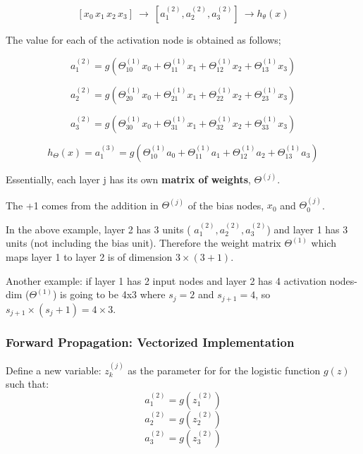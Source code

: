             \[
                \boxed{
                [x_0 \, x_1 \, x_2\, x_3] \:\rightarrow \: [ a_1^{(2)},a_2^{(2)},a_3^{(2)}] \: \rightarrow h_\theta (x)
            }
            \]  
    
            The value for each of the activation node is obtained as follows;

            \[
                a_1^{(2)} = g (\Theta^{(1)}_{10} x_0 + \Theta^{(1)}_{11} x_1 + \Theta^{(1)}_{12} x_2+\Theta^{(1)}_{13} x_3 )
            \] 

            \[
                a_2^{(2)} = g (\Theta^{(1)}_{20} x_0 + \Theta^{(1)}_{21} x_1 + \Theta^{(1)}_{22} x_2+\Theta^{(1)}_{23} x_3 )
            \] 

            \[
                a_3^{(2)} = g (\Theta^{(1)}_{30} x_0 + \Theta^{(1)}_{31} x_1 + \Theta^{(1)}_{32} x_2+\Theta^{(1)}_{33} x_3 )
            \] 

            \[
                h_\Theta(x) = a_1^{(3)} = g (\Theta^{(1)}_{10} a_0 + \Theta^{(1)}_{11} a_1 + \Theta^{(1)}_{12} a_2+\Theta^{(1)}_{13} a_3 )
            \] 

            Essentially, each layer j has its own \textbf{matrix of weights}, $\Theta^{(j)}$.\\

            The +1 comes from the addition in $\Theta^{(j)}$ of the bias nodes, $x_0$ and $\Theta_0^{(j)}$. 
            
            In the above example, layer 2 has 3 units ( $a_1^{(2)}, a_2^{(2)},a_3^{(2)}$) and layer 1 has 3 units (not including the bias unit). Therefore the weight matrix $\Theta^{(1)}$ which maps layer 1 to layer 2 is of dimension $3\times(3+1)$. 

            Another example: if layer 1 has 2 input nodes and layer 2 has 4 activation nodes- dim ($\Theta^{(1)}$) is going to be 4x3 where $s_j=2$ and $s_{j+1}=4$, so $s_{j+1}\times (s_j +1)=4\times3$.

            \subsubsection{Forward Propagation: Vectorized Implementation}
                Define a new variable: $z_k^{(j)}$ as the parameter for for the logistic function $g(z)$ such that:
                \[
                    a_1^{(2)} = g (z_1^{(2)})
                \] 
                \[
                    a_2^{(2)} = g (z_2^{(2)})
                \] 
                \[
                    a_3^{(2)} = g (z_3^{(2)})
                \] 
              
